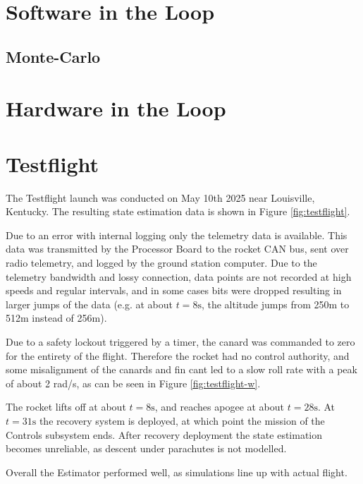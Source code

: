 \section{Software in the Loop}

\subsection{Monte-Carlo}

\section{Hardware in the Loop}

\clearpage
\section{Testflight}
The Testflight launch was conducted on May 10th 2025 near Louisville, Kentucky.
The resulting state estimation data is shown in Figure \ref{fig:testflight}.

Due to an error with internal logging only the telemetry data is available. This data was transmitted by the Processor Board to the rocket CAN bus, sent over radio telemetry, and logged by the ground station computer.
Due to the telemetry bandwidth and lossy connection, data points are not recorded at high speeds and regular intervals, and in some cases bits were dropped resulting in larger jumps of the data (e.g. at about $t=8\mathrm{s}$, the altitude jumps from 250m to 512m instead of 256m).   

Due to a safety lockout triggered by a timer, the canard was commanded to zero for the entirety of the flight.
Therefore the rocket had no control authority, and some misalignment of the canards and fin cant led to a slow roll rate with a peak of about 2 rad/s, as can be seen in Figure \ref{fig:testflight-w}.

The rocket lifts off at about $t=8\mathrm{s}$, and reaches apogee at about $t=28\mathrm{s}$.
At $t=31\mathrm{s}$ the recovery system is deployed, at which point the mission of the Controls subsystem ends. 
After recovery deployment the state estimation becomes unreliable, as descent under parachutes is not modelled.

Overall the Estimator performed well, as simulations line up with actual flight. 

